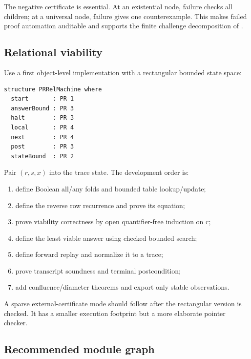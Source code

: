The negative certificate is essential.  At an existential node, failure checks all children; at a universal node, failure gives one counterexample.  This makes failed proof automation auditable and supports the finite challenge decomposition of .

\subsection{Relational viability}

Use a first object-level implementation with a rectangular bounded state space:

\begin{lstlisting}[language={}] 
structure PRRelMachine where
  start       : PR 1
  answerBound : PR 3
  halt        : PR 3
  local       : PR 4
  next        : PR 4
  post        : PR 3
  stateBound  : PR 2
\end{lstlisting}

Pair \((r,s,x)\) into the trace state.  The development order is:

\begin{enumerate}
\item define Boolean all/any folds and bounded table lookup/update;
\item define the reverse row recurrence and prove its equation;
\item prove viability correctness by open quantifier-free induction on \(r\);
\item define the least viable answer using checked bounded search;
\item define forward replay and normalize it to a trace;
\item prove transcript soundness and terminal postcondition;
\item add confluence/diameter theorems and export only stable observations.
\end{enumerate}

A sparse external-certificate mode should follow after the rectangular version is checked.  It has a smaller execution footprint but a more elaborate pointer checker.

\subsection{Recommended module graph}

